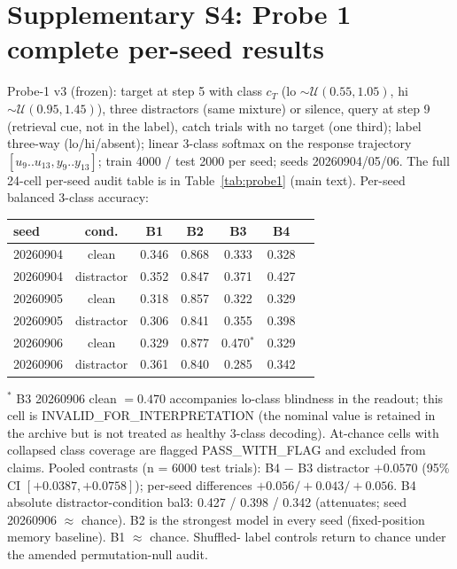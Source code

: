 \section{Supplementary S4: Probe 1 complete per-seed results}

Probe-1 v3 (frozen): target at step 5 with class
$c_T$ (lo $\sim\mathcal{U}(0.55,1.05)$, hi $\sim\mathcal{U}(0.95,1.45)$),
three distractors (same mixture) or silence, query at step 9 (retrieval
cue, not in the label), catch trials with no target (one third); label
three-way (lo/hi/absent); linear 3-class softmax on the response
trajectory $[u_9..u_{13}, y_9..y_{13}]$; train 4000 / test 2000 per seed;
seeds 20260904/05/06.  The full 24-cell per-seed audit table is in
Table~\ref{tab:probe1} (main text).  Per-seed balanced 3-class accuracy:

\begin{center}
\small
\begin{tabular}{lcccccc}
\toprule
seed & cond. & B1 & B2 & B3 & B4 \\
\midrule
20260904 & clean & 0.346 & 0.868 & 0.333 & 0.328 \\
20260904 & distractor & 0.352 & 0.847 & 0.371 & 0.427 \\
20260905 & clean & 0.318 & 0.857 & 0.322 & 0.329 \\
20260905 & distractor & 0.306 & 0.841 & 0.355 & 0.398 \\
20260906 & clean & 0.329 & 0.877 & 0.470$^{*}$ & 0.329 \\
20260906 & distractor & 0.361 & 0.840 & 0.285 & 0.342 \\
\bottomrule
\end{tabular}
\end{center}

$^{*}$ B3 20260906 clean $= 0.470$ accompanies lo-class blindness in the
readout; this cell is INVALID\_\allowbreak{}FOR\_\allowbreak{}INTERPRETATION (the nominal value is
retained in the archive but is not treated as healthy 3-class decoding).
At-chance cells with collapsed class coverage are flagged
PASS\_\allowbreak{}WITH\_\allowbreak{}FLAG and excluded from claims.  Pooled contrasts (n = 6000
test trials): B4 $-$ B3 distractor $+0.0570$ (95\% CI
$[+0.0387,+0.0758]$); per-seed differences $+0.056/+0.043/+0.056$.  B4
absolute distractor-condition bal3: 0.427 / 0.398 / 0.342 (attenuates;
seed 20260906 $\approx$ chance).  B2 is the strongest model in every
seed (fixed-position memory baseline).  B1 $\approx$ chance.  Shuffled-
label controls return to chance under the amended permutation-null
audit.
